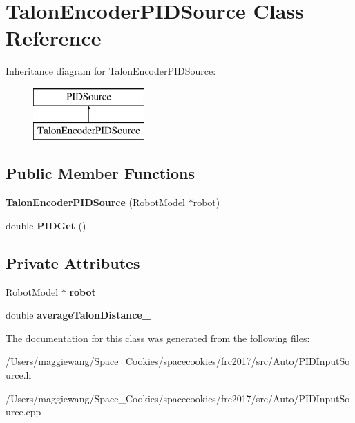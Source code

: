 \hypertarget{class_talon_encoder_p_i_d_source}{}\section{Talon\+Encoder\+P\+I\+D\+Source Class Reference}
\label{class_talon_encoder_p_i_d_source}
Inheritance diagram for Talon\+Encoder\+P\+I\+D\+Source\+:\begin{figure}[H]
\begin{center}
\leavevmode
\includegraphics[height=2.000000cm]{class_talon_encoder_p_i_d_source}
\end{center}
\end{figure}
\subsection*{Public Member Functions}
\begin{DoxyCompactItemize}
\item 
\mbox{\label{class_talon_encoder_p_i_d_source_a28f25e0a00329e64f15709b598dc0eda}} 
{\bfseries Talon\+Encoder\+P\+I\+D\+Source} (\hyperlink{class_robot_model}{Robot\+Model} $\ast$robot)
\item 
\mbox{\label{class_talon_encoder_p_i_d_source_a0817f0ebd370ae8a6a00fd376d0840cb}} 
double {\bfseries P\+I\+D\+Get} ()
\end{DoxyCompactItemize}
\subsection*{Private Attributes}
\begin{DoxyCompactItemize}
\item 
\mbox{\label{class_talon_encoder_p_i_d_source_aa4e781ff25f6cb983fe40651b64f5f74}} 
\hyperlink{class_robot_model}{Robot\+Model} $\ast$ {\bfseries robot\+\_\+}
\item 
\mbox{\label{class_talon_encoder_p_i_d_source_a7a1118cb2256b0d597f3e987c8062cf9}} 
double {\bfseries average\+Talon\+Distance\+\_\+}
\end{DoxyCompactItemize}


The documentation for this class was generated from the following files\+:\begin{DoxyCompactItemize}
\item 
/\+Users/maggiewang/\+Space\+\_\+\+Cookies/spacecookies/frc2017/src/\+Auto/P\+I\+D\+Input\+Source.\+h\item 
/\+Users/maggiewang/\+Space\+\_\+\+Cookies/spacecookies/frc2017/src/\+Auto/P\+I\+D\+Input\+Source.\+cpp\end{DoxyCompactItemize}
